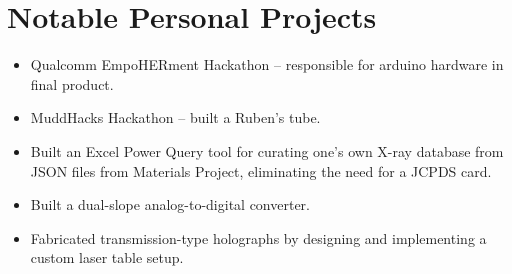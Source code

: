 \documentclass[letterpaper,10.8pt]{article}
\newcommand{\resumeItemNoTitle}[2]{\item\small{\textbf{#1}{ #2 \vspace{-2pt}}}}
\newcommand{\resumeSubHeadingListStart}{\begin{itemize}[leftmargin=*]}
\newcommand{\resumeSubHeadingListEnd}{\end{itemize}}
\begin{document}
\section{Notable Personal Projects}
\resumeSubHeadingListStart  
\resumeItemNoTitle{}{Qualcomm EmpoHERment Hackathon -- responsible for arduino hardware in final product.}
\resumeItemNoTitle{}{MuddHacks Hackathon -- built a Ruben's tube.}
\resumeItemNoTitle{}{Built an Excel Power Query tool for curating one's own X-ray database from JSON files from Materials Project, eliminating the need for a JCPDS card.}
\resumeItemNoTitle{}{Built a dual-slope analog-to-digital converter.}
\resumeItemNoTitle{}{Fabricated transmission-type holographs by designing and implementing a custom laser table setup.}
\resumeSubHeadingListEnd
 
\end{document}
